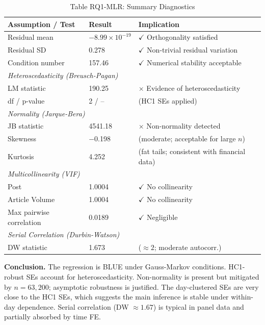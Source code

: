 \documentclass[11pt]{article}
\begin{document}
\begin{table}[H]
\centering
\caption*{Table RQ1-MLR: Summary Diagnostics}
\begin{tabular}{lll}
\toprule
Assumption / Test & Result & Implication \\
\midrule
Residual mean & $-8.99 \times 10^{-19}$ & $\checkmark$ Orthogonality satisfied \\
Residual SD & 0.278 & $\checkmark$ Non-trivial residual variation \\
Condition number & 157.46 & $\checkmark$ Numerical stability acceptable \\
\midrule
\multicolumn{3}{l}{\textit{Heteroscedasticity (Breusch-Pagan)}} \\
LM statistic & 190.25 & $\times$ Evidence of heteroscedasticity \\
df / p-value & 2 / -- & (HC1 SEs applied) \\
\midrule
\multicolumn{3}{l}{\textit{Normality (Jarque-Bera)}} \\
JB statistic & 4541.18 & $\times$ Non-normality detected \\
Skewness & $-$0.198 & (moderate; acceptable for large $n$) \\
Kurtosis & 4.252 & (fat tails; consistent with financial data) \\
\midrule
\multicolumn{3}{l}{\textit{Multicollinearity (VIF)}} \\
Post & 1.0004 & $\checkmark$ No collinearity \\
Article Volume & 1.0004 & $\checkmark$ No collinearity \\
Max pairwise correlation & 0.0189 & $\checkmark$ Negligible \\
\midrule
\multicolumn{3}{l}{\textit{Serial Correlation (Durbin-Watson)}} \\
DW statistic & 1.673 & ($\approx 2$; moderate autocorr.) \\
\bottomrule
\end{tabular}
\end{table}

\textbf{Conclusion.} The regression is BLUE under Gauss-Markov conditions. HC1-robust SEs account for heteroscedasticity. Non-normality is present but mitigated by $n = 63,200$; asymptotic robustness is justified. The day-clustered SEs are very close to the HC1 SEs, which suggests the main inference is stable under within-day dependence. Serial correlation (DW $\approx 1.67$) is typical in panel data and partially absorbed by time FE.

\newpage
\end{document}
